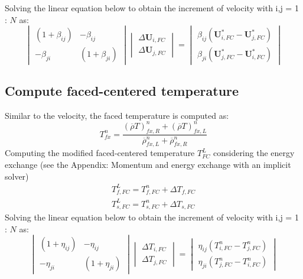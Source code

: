 \documentclass[preprint,12pt]{elsarticle}
\begin{document}
%
%
Solving the linear equation below to obtain the increment of velocity with i,j = 1 : $N$ as:
%
%
\[ \begin{vmatrix} (1 + \beta_{ij})  &  -\beta_{ij} \\
                  -\beta_{ji}       &  (1 + \beta_{ji})
    \end {vmatrix}
    \begin{vmatrix} \Delta \pmb{U}_{i,FC} \\
                    \Delta \pmb{U}_{j,FC}
    \end {vmatrix}
    =
    \begin{vmatrix}  \beta_{ij}(\pmb{U}_{i,FC}^{*} - \pmb{U}_{j,FC}^{*}) \\
                    \beta_{ji}(\pmb{U}_{j,FC}^{*} - \pmb{U}_{i,FC}^{*})
    \end {vmatrix}                
\]
%
%
\subsection{\textsf{Compute faced-centered temperature}}
Similar to the velocity, the faced temperature is computed as:
%
\begin{equation}
T_{fx}^{n} = \frac{(\overline{\rho} T)_{fx,R}^n + (\overline{\rho} T)_{fx,L}^n}{\overline{\rho}_{fx,L}^n + \overline{\rho}_{fx,R}^n} 
\end {equation}
%
%
Computing the modified faced-centered temperature $T_{FC}^{L}$ considering the energy exchange (see the Appendix: Momentum and energy exchange with an implicit solver)
%
\begin{equation}
\begin{gathered}
   T_{f,FC}^{L} = T_{f,FC}^{n} + \Delta T_{f,FC}\\
   T_{s,FC}^{L} = T_{s,FC}^{n} + \Delta T_{s,FC}
\end {gathered}
\end {equation}
%
%
Solving the linear equation below to obtain the increment of velocity with i,j = 1 : $N$ as:
%
%
\[ \begin{vmatrix} (1 + \eta_{ij})  &  -\eta_{ij} \\
                  -\eta_{ji}       &  (1 + \eta_{ji})
    \end {vmatrix}
    \begin{vmatrix} \Delta T_{i,FC} \\
                    \Delta T_{j,FC}
    \end {vmatrix}
    =
    \begin{vmatrix}  \eta_{ij}(T_{i,FC}^{n} - T_{j,FC}^{n}) \\
                    \eta_{ji}(T_{j,FC}^{n} - T_{i,FC}^{n})
    \end {vmatrix}                
\]
%
%
\end{document}
